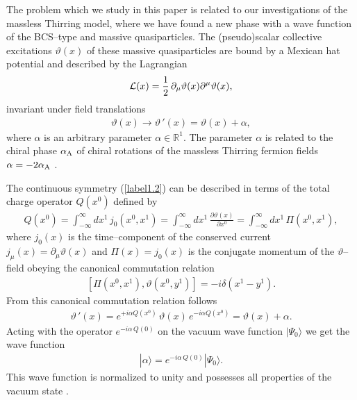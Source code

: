 \documentclass[a4paper,12pt] {article}
\begin{document}
\hspace{0.2in} The problem which we study in this paper is related to
our investigations of the massless Thirring model\cite{th0105057},
where we have found a new phase with a wave function of the BCS--type
and massive quasiparticles. The (pseudo)scalar collective excitations
$\vartheta(x)$ of these massive quasiparticles are bound by a Mexican
hat potential and described by the Lagrangian
%
\begin{eqnarray}\label{label1.1}
{\cal L}(x) =
\frac{1}{2}\,\partial_{\mu}\vartheta(x)\partial^{\mu}\vartheta(x),
\end{eqnarray}
%
invariant under field translations
%
\begin{eqnarray}\label{label1.2}
 \vartheta(x) \to \vartheta\,'(x) = \vartheta(x) + \alpha,
\end{eqnarray}
%
where $\alpha$ is an arbitrary parameter $\alpha \in \mathbb{R}^1$.
The parameter $\alpha$ is related to the chiral phase $\alpha_{\rm A}$
of chiral rotations of the massless Thirring fermion fields $\alpha =
-2\alpha_{\rm A}$ \cite{th0105057,th0112184}.

The continuous symmetry (\ref{label1.2}) can be described in terms of
the total charge operator $Q(x^0)$ defined by
\cite{th0112184,th0204237,th0206244}
%
\begin{eqnarray}\label{label1.3}
Q(x^0) = \int^{\infty}_{-\infty}dx^1\,j_0(x^0,x^1) =
\int^{\infty}_{-\infty}dx^1\,\frac{\partial \vartheta(x)}{\partial
x^0} = \int^{\infty}_{-\infty}dx^1\,\Pi(x^0,x^1),
\end{eqnarray}
%
where $j_0(x)$ is the time--component of the conserved current
$j_{\mu}(x) = \partial_{\mu}\vartheta(x)$ and $\Pi(x) = j_0(x)$ is the
conjugate momentum of the $\vartheta$--field obeying the canonical
commutation relation
%
\begin{eqnarray}\label{label1.4}
[\Pi(x^0,x^1),\vartheta(x^0,y^1)] = -i\delta(x^1 - y^1).
\end{eqnarray}
%
From this canonical commutation relation follows
%
\begin{eqnarray}\label{label1.5}
\vartheta\,'(x) = e^{\textstyle +i\alpha
Q(x^0)}\,\vartheta(x)\,e^{\textstyle - i\alpha Q(x^0)} = \vartheta(x)
+ \alpha.
\end{eqnarray}
%
Acting with the operator $e^{\textstyle -i\alpha\,Q(0)}$ on the vacuum
wave function $|\Psi_0\rangle$ we get the wave function
%
\begin{eqnarray}\label{label1.6}
|\alpha\rangle = e^{\textstyle -i\alpha\,Q(0)}|\Psi_0\rangle.
\end{eqnarray}
%
This wave function is normalized to unity and possesses all properties
of the vacuum state \cite{Yo76}.
\end{document}
